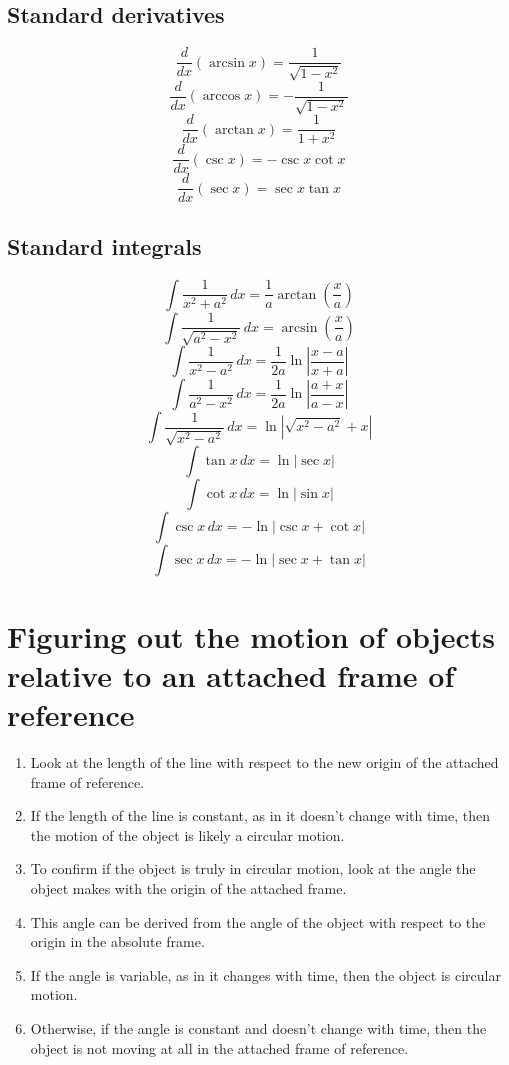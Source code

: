 \documentclass[11pt]{article}
\begin{document}
\subsection{Standard derivatives}
\label{sec:org1ab4fef}
\[\frac{d}{dx} \left(\arcsin x \right) = \frac{1}{\sqrt{1 - x^2}}\]
\[\frac{d}{dx} \left(\arccos x \right) = - \frac{1}{\sqrt{1 - x^2}}\]
\[\frac{d}{dx} \left(\arctan x \right) = \frac{1}{1 + x^2}\]
\[\frac{d}{dx} \left(\csc x \right) = - \csc x \cot x\]
\[\frac{d}{dx} \left(\sec x \right) = \sec x \tan x\]

\subsection{Standard integrals}
\label{sec:org408d814}
\[\int \frac{1}{x^2 + a^2} \, dx = \frac{1}{a} \arctan \left(\frac{x}{a} \right)\]
\[\int \frac{1}{\sqrt{a^2 - x^2}} \, dx = \arcsin \left(\frac{x}{a} \right)\]
\[\int \frac{1}{x^2 - a^2} \, dx = \frac{1}{2a} \ln \left|\frac{x - a}{x + a} \right|\]
\[\int \frac{1}{a^2 - x^2} \, dx = \frac{1}{2a} \ln \left|\frac{a + x}{a - x} \right|\]
\[\int \frac{1}{\sqrt{x^2 - a^2}} \, dx = \ln \left|\sqrt{x^2 - a^2} + x \right|\]
\[\int \tan x \, dx = \ln |\sec x|\]
\[\int \cot x \, dx = \ln |\sin x|\]
\[\int \csc x \, dx = - \ln |\csc x + \cot x|\]
\[\int \sec x \, dx = - \ln |\sec x + \tan x|\]

\section{Figuring out the motion of objects relative to an attached frame of reference}
\label{sec:org39b3437}
\begin{enumerate}
\item Look at the length of the line with respect to the new origin of the attached frame of reference.
\item If the length of the line is constant, as in it doesn't change with time, then the motion of the object is likely a circular motion.
\item To confirm if the object is truly in circular motion, look at the angle the object makes with the origin of the attached frame.
\item This angle can be derived from the angle of the object with respect to the origin in the absolute frame.
\item If the angle is variable, as in it changes with time, then the object is circular motion.
\item Otherwise, if the angle is constant and doesn't change with time, then the object is not moving at all in the attached frame of reference.
\end{enumerate}
\end{document}
